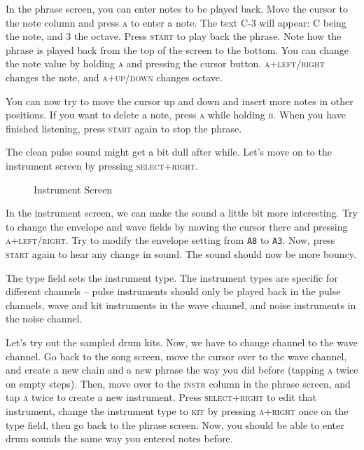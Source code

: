 In the phrase screen, you can enter notes to be played back. Move the cursor to the note
column and press \textsc{a} to enter a note. The text C-3 will appear: C being the note, and 3 the
octave. Press \textsc{start} to play back the phrase. Note how the phrase is played back from the
top of the screen to the bottom. You can change the note value by holding \textsc{a} and pressing the
cursor button. \textsc{a+left/right} changes the note, and \textsc{a+up/down} changes octave.

You can now try to move the cursor up and down and insert more notes in other positions. If
you want to delete a note, press \textsc{a} while holding \textsc{b}. When you have finished listening, press
\textsc{start} again to stop the phrase.

The clean pulse sound might get a bit dull after while. Let's move on to the instrument
screen by pressing \textsc{select+right}.

\begin{figure}[hbtp]
\centering
{}
\caption{Instrument Screen}
\label{fig:instr}
\end{figure}

In the instrument screen, we can make the sound a little bit more interesting. Try to change
the envelope and wave fields by moving the cursor there and pressing \textsc{a+left/right}. Try
to modify the envelope setting from \texttt{A8} to \texttt{A3}. Now, press \textsc{start} again to hear any
change in sound. The sound should now be more bouncy.

The type field sets the instrument type. The instrument types are specific for different
channels -- pulse instruments should only be played back in the pulse channels, wave and kit
instruments in the wave channel, and noise instruments in the noise channel.

Let's try out the sampled drum kits. Now, we have to change channel to the wave channel.
Go back to the song screen, move the cursor over to the wave channel, and create a new
chain and a new phrase the way you did before (tapping \textsc{a} twice on empty steps). Then,
move over to the \textsc{instr} column in the phrase screen, and tap \textsc{a} twice to create a new
instrument. Press \textsc{select+right} to edit that instrument, change the instrument type to
\textsc{kit} by pressing \textsc{a+right} once on the type field, then go back to the phrase screen. Now,
you should be able to enter drum sounds the same way you entered notes before.

